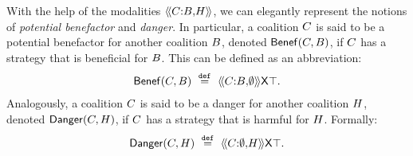 \documentclass{article}
\begin{document}
With the help of the modalities $\langle\!\langle C{:}B{,}H  \rangle\!\rangle$, we can elegantly represent the notions of \emph{potential benefactor} and \emph{danger}.
In particular, a coalition $C$ is said to be a  potential benefactor   for another coalition $B$, denoted $\mathsf{Benef}(C, B)$, if $C$ has a strategy that is beneficial for $B$. This can be defined as an abbreviation:
\begin{align*}
   \mathsf{Benef}(C, B) \ \stackrel{\mathtt{def}}{=} \  
   \langle\!\langle C{:}B{,}\emptyset   \rangle\!\rangle
   \mathsf{X} \top .
\end{align*}
Analogously, a coalition $C$ is said to be a    danger  for another coalition $H$, denoted $\mathsf{Danger}(C, H)$, if $C$ has a strategy that is harmful for $H$. Formally:
\begin{align*}
   \mathsf{Danger}(C, H) \ \stackrel{\mathtt{def}}{=} \  
   \langle\!\langle C{:}\emptyset{,}H   \rangle\!\rangle
   \mathsf{X} \top .
\end{align*}
\end{document}
